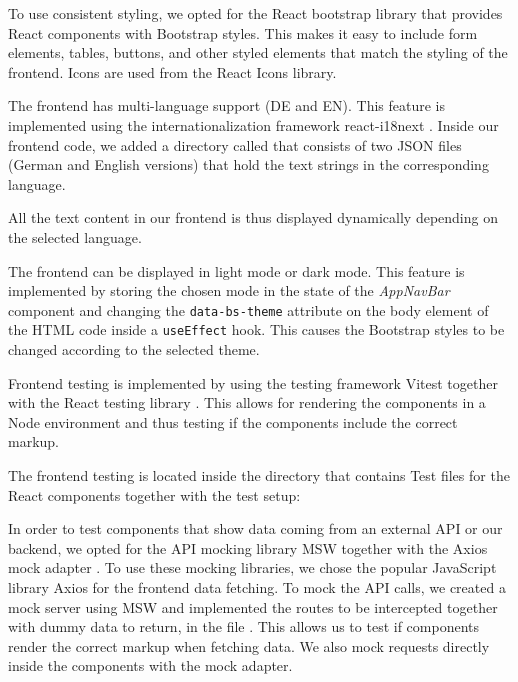 \documentclass[conference,a4paper,flushend]{cs-techrep}
\begin{document}

To use consistent styling, we opted for the React bootstrap library \cite{noauthor_react_nodate-1} that provides React components with Bootstrap \cite{bootstrap} styles. This makes it easy to include form elements, tables, buttons, and other styled elements that match the styling of the frontend. Icons are used from the React Icons \cite{noauthor_react_nodate} library.


The frontend has multi-language support (DE and EN). This feature is implemented using the internationalization framework react-i18next \cite{noauthor_introduction_2024}. Inside our frontend code, we added a directory called  that consists of two JSON files (German and English versions) that hold the text strings in the corresponding language.


All the text content in our frontend is thus displayed dynamically depending on the selected language.

The frontend can be displayed in light mode or dark mode. This feature is implemented by storing the chosen mode in the state of the \textit{AppNavBar} component and changing the \lstinline|data-bs-theme| attribute on the body element of the HTML code inside a \lstinline|useEffect| hook. This causes the Bootstrap styles to be changed according to the selected theme.


Frontend testing is implemented by using the testing framework Vitest \cite{vitest} together with the React testing library \cite{noauthor_react_2024}. This allows for rendering the components in a Node environment and thus testing if the components include the correct markup. 

The frontend testing is located inside the  directory that contains Test files for the React components together with the test setup:
\newpage


In order to test components that show data coming from an external API or our backend, we opted for the API mocking library MSW \cite{noauthor_mock_nodate} together with the Axios mock adapter \cite{noauthor_axios-mock-adapter_2023}. To use these mocking libraries, we chose the popular JavaScript library Axios \cite{noauthor_axios_nodate} for the frontend data fetching. To mock the API calls, we created a mock server using MSW and implemented the routes to be intercepted together with dummy data to return, in the file . This allows us to test if components render the correct markup when fetching data. We also mock requests directly inside the components with the mock adapter.
\end{document}
